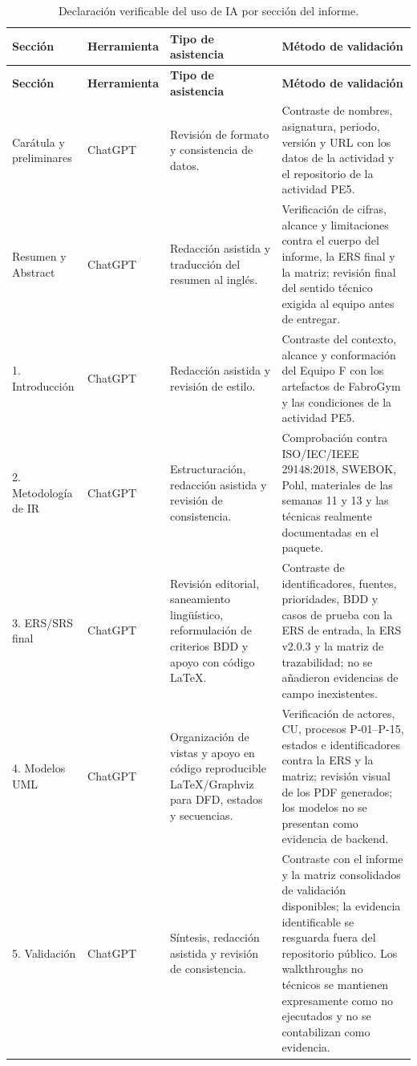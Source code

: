 \documentclass[11pt,a4paper]{article}
\begin{document}
{\footnotesize\begin{longtable}{|p{2.4cm}|p{2.0cm}|p{3.6cm}|p{5.9cm}|}
\caption{Declaración verificable del uso de IA por sección del informe.}\\\hline
\textbf{Sección} & \textbf{Herramienta} & \textbf{Tipo de asistencia} & \textbf{Método de validación}\\\hline
\endfirsthead
\hline\textbf{Sección} & \textbf{Herramienta} & \textbf{Tipo de asistencia} & \textbf{Método de validación}\\\hline
\endhead
Carátula y preliminares & ChatGPT & Revisión de formato y consistencia de datos. & Contraste de nombres, asignatura, periodo, versión y URL con los datos de la actividad y el repositorio de la actividad PE5.\\\hline
Resumen y Abstract & ChatGPT & Redacción asistida y traducción del resumen al inglés. & Verificación de cifras, alcance y limitaciones contra el cuerpo del informe, la ERS final y la matriz; revisión final del sentido técnico exigida al equipo antes de entregar.\\\hline
1. Introducción & ChatGPT & Redacción asistida y revisión de estilo. & Contraste del contexto, alcance y conformación del Equipo F con los artefactos de FabroGym y las condiciones de la actividad PE5.\\\hline
2. Metodología de IR & ChatGPT & Estructuración, redacción asistida y revisión de consistencia. & Comprobación contra ISO/IEC/IEEE 29148:2018, SWEBOK, Pohl, materiales de las semanas 11 y 13 y las técnicas realmente documentadas en el paquete.\\\hline
3. ERS/SRS final & ChatGPT & Revisión editorial, saneamiento lingüístico, reformulación de criterios BDD y apoyo con código LaTeX. & Contraste de identificadores, fuentes, prioridades, BDD y casos de prueba con la ERS de entrada, la ERS v2.0.3 y la matriz de trazabilidad; no se añadieron evidencias de campo inexistentes.\\\hline
4. Modelos UML & ChatGPT & Organización de vistas y apoyo en código reproducible LaTeX/Graphviz para DFD, estados y secuencias. & Verificación de actores, CU, procesos P-01--P-15, estados e identificadores contra la ERS y la matriz; revisión visual de los PDF generados; los modelos no se presentan como evidencia de backend.\\\hline
5. Validación & ChatGPT & Síntesis, redacción asistida y revisión de consistencia. & Contraste con el informe y la matriz consolidados de validación disponibles; la evidencia identificable se resguarda fuera del repositorio público. Los walkthroughs no técnicos se mantienen expresamente como no ejecutados y no se contabilizan como evidencia.\\\hline

\end{longtable}}
\end{document}

